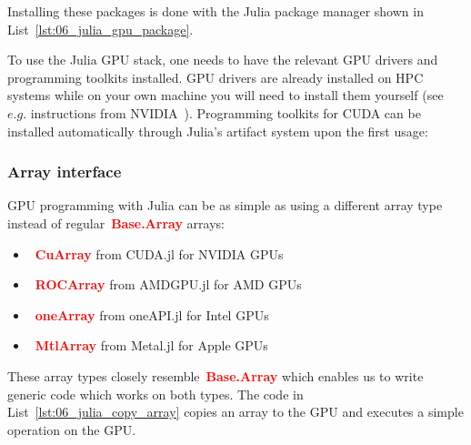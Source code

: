\par
Installing these packages is done with the Julia package manager shown in List~\ref{lst:06_julia_gpu_package}.





\par
To use the Julia GPU stack, one needs to have the relevant GPU drivers and programming toolkits installed.
GPU drivers are already installed on HPC systems while on your own machine you will need to install them yourself (see $e.g.$ instructions from NVIDIA~\cite{nvidia_driver}).
Programming toolkits for CUDA can be installed automatically through Julia’s artifact system upon the first usage:



\subsubsection{Array interface}


\par
GPU programming with Julia can be as simple as using a different array type instead of regular~\textbf{\textcolor{red}{Base.Array}} arrays:
\begin{itemize}
    \item~\textbf{\textcolor{red}{CuArray}} from CUDA.jl for NVIDIA GPUs
    \item~\textbf{\textcolor{red}{ROCArray}} from AMDGPU.jl for AMD GPUs
    \item~\textbf{\textcolor{red}{oneArray}} from oneAPI.jl for Intel GPUs
    \item~\textbf{\textcolor{red}{MtlArray}} from Metal.jl for Apple GPUs
\end{itemize}


\par
These array types closely resemble~\textcolor{red}{\textbf{Base.Array}} which enables us to write generic code which works on both types.
The code in List~\ref{lst:06_julia_copy_array} copies an array to the GPU and executes a simple operation on the GPU.





